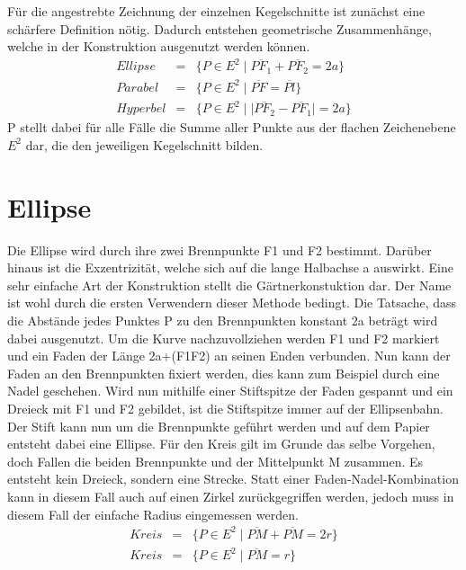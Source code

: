 \setcounter{section}{0}
Für die angestrebte Zeichnung der einzelnen Kegelschnitte ist zunächst eine schärfere Definition nötig. Dadurch entstehen geometrische Zusammenhänge, welche in der Konstruktion ausgenutzt werden können.
\begin{displaymath}
	\begin{array}{rcl}
		Ellipse  & = & \{P\in E^2\;|\;\overline{{PF}_1} + \overline{{PF}_2} = 2a\}\\
		Parabel  & = & \{P\in E^2\;|\;\overline{PF} = \overline{Pl}\}\\
		Hyperbel & = & \{P\in E^2\;|\;|\overline{{PF}_2} - \overline{{PF}_1}| = 2a\}
	\end{array}
\end{displaymath}
P stellt dabei für alle Fälle die Summe aller Punkte aus der flachen Zeichenebene $E^2$ dar, die den jeweiligen Kegelschnitt bilden.
\section{Ellipse}
Die Ellipse wird durch ihre zwei Brennpunkte F1 und F2 bestimmt. Darüber hinaus ist die Exzentrizität, welche sich auf die lange Halbachse a auswirkt.
Eine sehr einfache Art der Konstruktion stellt die Gärtnerkonstuktion dar. Der Name ist wohl durch die ersten Verwendern dieser Methode bedingt.
Die Tatsache, dass die Abstände jedes Punktes P zu den Brennpunkten konstant 2a beträgt wird dabei ausgenutzt. Um die Kurve nachzuvollziehen werden F1 und F2 markiert und ein Faden der Länge 2a+(F1F2) an seinen Enden verbunden. Nun kann der Faden an den Brennpunkten fixiert werden, dies kann zum Beispiel durch eine Nadel geschehen.
Wird nun mithilfe einer Stiftspitze der Faden gespannt und ein Dreieck mit F1 und F2 gebildet, ist die Stiftspitze immer auf der Ellipsenbahn. Der Stift kann nun um die Brennpunkte geführt werden und auf dem Papier entsteht dabei eine Ellipse.
Für den Kreis gilt im Grunde das selbe Vorgehen, doch Fallen die beiden Brennpunkte und der Mittelpunkt M zusammen. Es entsteht kein Dreieck, sondern eine Strecke. Statt einer Faden-Nadel-Kombination kann in diesem Fall auch auf einen Zirkel zurückgegriffen werden, jedoch muss in diesem Fall der einfache Radius eingemessen werden.
\begin{displaymath}
	\begin{array}{rcl}
		Kreis & = & \{P\in E^2\;|\;\overline{PM} + \overline{PM} = 2r\}\\
		Kreis & = & \{P\in E^2\;|\;\overline{PM} = r\}
	\end{array}
\end{displaymath}
